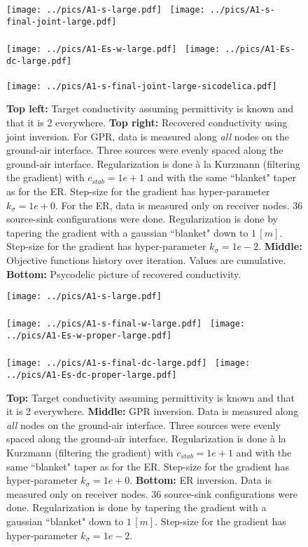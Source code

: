 \documentclass[a4paper,12pt]{article}
\begin{document}
\begin{figure}[t!]
\centering
\texttt{[image: ../pics/A1-s-large.pdf]}~
\texttt{[image: ../pics/A1-s-final-joint-large.pdf]}
\\~\\
\texttt{[image: ../pics/A1-Es-w-large.pdf]}~
\texttt{[image: ../pics/A1-Es-dc-large.pdf]}
\\~\\
\texttt{[image: ../pics/A1-s-final-joint-large-sicodelica.pdf]}
\caption{{\bf Top left:} Target conductivity assuming permittivity is known and that it is 2 everywhere. 
{\bf Top right:} Recovered conductivity using joint inversion. 
For GPR, data is measured along {\it all} nodes on the ground-air interface. 
Three sources were evenly spaced along the ground-air interface. 
Regularization is done \`a la Kurzmann (filtering the gradient) with $c_{stab}=1e+1$ and 
with the same ``blanket" taper as for the ER. 
Step-size for the gradient has hyper-parameter $k_\sigma = 1e+0$. 
For the ER, data is measured only on receiver nodes. 
36 source-sink configurations were done. 
Regularization is done by tapering the gradient with a gaussian ``blanket" down to $1\,[m]$. 
Step-size for the gradient has hyper-parameter $k_\sigma = 1e-2$. 
{\bf Middle:} Objective functions history over iteration. Values are cumulative. 
{\bf Bottom:} Psycodelic picture of recovered conductivity.
}
\label{fig:fig2}
\end{figure}
%
\begin{figure}[t!]
\centering
\texttt{[image: ../pics/A1-s-large.pdf]}
\\~\\
\texttt{[image: ../pics/A1-s-final-w-large.pdf]}~
\texttt{[image: ../pics/A1-Es-w-proper-large.pdf]}
\\~\\
\texttt{[image: ../pics/A1-s-final-dc-large.pdf]}~
\texttt{[image: ../pics/A1-Es-dc-proper-large.pdf]}
\caption{{\bf Top:} Target conductivity assuming permittivity is known and that it is 2 everywhere. 
{\bf Middle:} GPR inversion. Data is measured along {\it all} nodes on the ground-air interface. 
Three sources were evenly spaced along the ground-air interface. 
Regularization is done \`a la Kurzmann (filtering the gradient) with $c_{stab}=1e+1$ and 
with the same ``blanket" taper as for the ER. 
Step-size for the gradient has hyper-parameter $k_\sigma = 1e+0$. 
{\bf Bottom:} ER inversion. Data is measured only on receiver nodes. 
36 source-sink configurations were done. 
Regularization is done by tapering the gradient with a gaussian ``blanket" down to $1\,[m]$. 
Step-size for the gradient has hyper-parameter $k_\sigma = 1e-2$. 
}
\label{fig:fig3}
\end{figure}
\end{document}
